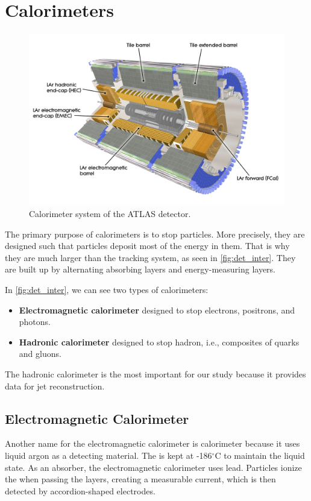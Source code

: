 \section{Calorimeters}
\label{sec:calorimeters}
\begin{figure}[htb]
    \centering
    \includegraphics[width=1\linewidth]{src/img/calo.jpg}
    \caption{Calorimeter system of the ATLAS detector.}
    \label{fig:calorimeter}
\end{figure}

The primary purpose of calorimeters is to stop particles. 
More precisely, they are designed such that particles deposit most of the energy in them.
That is why they are much larger than the tracking system, as seen in \cref{fig:det_inter}. 
They are built up by alternating absorbing layers and energy-measuring layers. 

In \cref{fig:det_inter}, we can see two types of calorimeters:
\begin{itemize}
    \item \textbf{Electromagnetic calorimeter} designed to stop electrons, positrons, and photons.
    \item \textbf{Hadronic calorimeter} designed to stop hadron, i.e., composites of quarks and gluons.
\end{itemize}

The hadronic calorimeter is the most important for our study because it provides data for jet reconstruction.


\subsection{Electromagnetic Calorimeter}
Another name for the electromagnetic calorimeter is \LAr calorimeter because it uses liquid argon as a detecting material.
The \LAr is kept at -186$^\circ$C to maintain the liquid state.
As an absorber, the electromagnetic calorimeter uses lead.
Particles ionize the \LAr when passing the layers, creating a measurable current, which is then detected by accordion-shaped electrodes.

